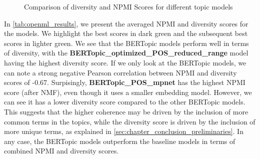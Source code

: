 \begin{figure}[h]
    \centering
    \hfill
    \caption{Comparison of diversity and NPMI Scores for different topic models}
    \label{fig:diversity_and_npmi_comparison}
\end{figure}

In \cref{tab:openml_results}, we present the averaged NPMI and diversity scores for the models. We highlight the best scores in dark green and the subsequent best scores in lighter green. We see that the BERTopic models perform well in terms of diversity, with the \textbf{\allowbreak BERTopic\_\allowbreak optimized\_\allowbreak POS\_\allowbreak reduced\_range} model having the highest diversity score. If we only look at the BERTopic models, we can note a strong negative Pearson correlation between NPMI and diversity scores of -0.67. Surpisingly, \textbf{BERTopic\_\allowbreak POS\_\allowbreak mpnet} has the highest NPMI score (after NMF), even though it uses a smaller embedding model. However, we can see it has a lower diversity score compared to the other BERTopic models. This suggests that the higher coherence may be driven by the inclusion of more common terms in the topics, while the diversity score is driven by the inclusion of more unique terms, as explained in \cref{sec:chapter_conclusion_preliminaries}. In any case, the BERTopic models outperform the baseline models in terms of combined NPMI and diversity scores. 

